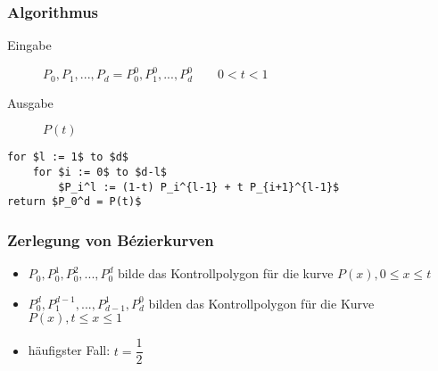 \subsubsection{Algorithmus}
\begin{description}
 \item[Eingabe] $P_0, P_1, ..., P_d = P_0^0, P_1^0, ..., P_d^0 \qquad 0 < t < 1$
 \item[Ausgabe] $P(t)$
\end{description}
\begin{lstlisting}[morekeywords=to]
for $l := 1$ to $d$
	for $i := 0$ to $d-l$
		$P_i^l := (1-t) P_i^{l-1} + t P_{i+1}^{l-1}$
return $P_0^d = P(t)$
\end{lstlisting}

\subsubsection{Zerlegung von Bézierkurven}
\begin{itemize}
 \item $P_0, P_0^1, P_0^2, ..., P_0^d$ bilde das Kontrollpolygon für die kurve $P(x), 0 \le x \le t$
 \item $P_0^d, P_1^{d-1}, ..., P_{d-1}^1, P_d^0$ bilden das Kontrollpolygon für die Kurve $P(x), t \le x \le 1$
 \item häufigster Fall: $t = \dfrac{1}{2}$
\end{itemize}


